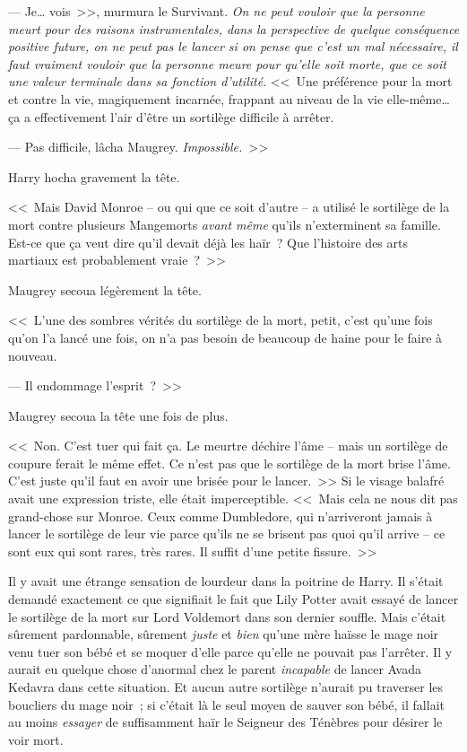 --- Je… vois~>>, murmura le Survivant. \emph{On ne peut vouloir que la personne meurt pour des raisons instrumentales, dans la perspective de quelque conséquence positive future, on ne peut pas le lancer si on pense que c'est un mal nécessaire, il faut vraiment vouloir que la personne meure pour qu'elle soit morte, que ce soit une valeur terminale dans sa fonction d'utilité}. <<~Une préférence pour la mort et contre la vie, magiquement incarnée, frappant au niveau de la vie elle-même… ça a effectivement l'air d'être un sortilège difficile à arrêter.

--- Pas difficile, lâcha Maugrey. \emph{Impossible.}~>>

Harry hocha gravement la tête.

<<~Mais David Monroe -- ou qui que ce soit d'autre -- a utilisé le sortilège de la mort contre plusieurs Mangemorts \emph{avant même} qu'ils n'exterminent sa famille. Est-ce que ça veut dire qu'il devait déjà les haïr~? Que l'histoire des arts martiaux est probablement vraie~?~>>

Maugrey secoua légèrement la tête.

<<~L'une des sombres vérités du sortilège de la mort, petit, c'est qu'une fois qu'on l'a lancé une fois, on n'a pas besoin de beaucoup de haine pour le faire à nouveau.

--- Il endommage l'esprit~?~>>

Maugrey secoua la tête une fois de plus.

<<~Non. C'est tuer qui fait ça. Le meurtre déchire l'âme -- mais un sortilège de coupure ferait le même effet. Ce n'est pas que le sortilège de la mort brise l'âme. C'est juste qu'il faut en avoir une brisée pour le lancer.~>> Si le visage balafré avait une expression triste, elle était imperceptible. <<~Mais cela ne nous dit pas grand-chose sur Monroe. Ceux comme Dumbledore, qui n'arriveront jamais à lancer le sortilège de leur vie parce qu'ils ne se brisent pas quoi qu'il arrive -- ce sont eux qui sont rares, très rares. Il suffit d'une petite fissure.~>>

Il y avait une étrange sensation de lourdeur dans la poitrine de Harry. Il s'était demandé exactement ce que signifiait le fait que Lily Potter avait essayé de lancer le sortilège de la mort sur Lord Voldemort dans son dernier souffle. Mais c'était sûrement pardonnable, sûrement \emph{juste} et \emph{bien} qu'une mère haïsse le mage noir venu tuer son bébé et se moquer d'elle parce qu'elle ne pouvait pas l'arrêter. Il y aurait eu quelque chose d'anormal chez le parent \emph{incapable} de lancer Avada Kedavra dans cette situation. Et aucun autre sortilège n'aurait pu traverser les boucliers du mage noir~; si c'était là le seul moyen de sauver son bébé, il fallait au moins \emph{essayer} de suffisamment haïr le Seigneur des Ténèbres pour désirer le voir mort.

